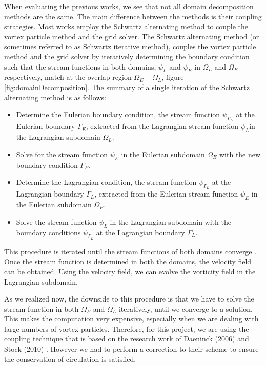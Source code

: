 When evaluating the previous works, we see that not all domain decomposition methods are the same. The main difference between the methods is their coupling strategies. Most works employ the Schwartz alternating method to couple the vortex particle method and the grid solver. The Schwartz alternating method (or sometimes referred to as Schwartz iterative method), couples the vortex particle method and the grid solver by iteratively determining the boundary condition such that the stream functions in both domains, $\psi_L$ and $\psi_E$ in $\Omega_L$ and $\Omega_E$ respectively, match at the overlap region $\Omega_E-\Omega_L$, figure \ref{fig:domainDecomposition}. The summary of a single iteration of the Schwartz alternating method is as follows:
	\begin{itemize}
	\item Determine the Eulerian boundary condition, the stream function $\psi_{\Gamma_E}$ at the Eulerian boundary $\Gamma_E$, extracted from the Lagrangian stream function $\psi_L$in the Lagrangian subdomain $\Omega_L$.
	\item Solve for the stream function $\psi_E$ in the Eulerian subdomain $\Omega_E$ with the new boundary condition $\Gamma_E$.
	\item Determine the Lagrangian condition, the stream function $\psi_{\Gamma_L}$ at the Lagrangian boundary $\Gamma_L$, extracted from the Eulerian stream function $\psi_E$ in the Eulerian subdomain $\Omega_E$.
	\item Solve the stream function $\psi_L$ in the Lagrangian subdomain with the boundary conditions $\psi_{\Gamma_L}$ at the Lagrangian boundary $\Gamma_L$.
	\end{itemize}
	
This procedure is iterated until the stream functions of both domains converge \cite{Ould-Salihi2001a}. Once the stream function is determined in both the domains, the velocity field can be obtained. Using the velocity field, we can evolve the vorticity field in the Lagrangian subdomain.

As we realized now, the downside to this procedure is that we have to solve the stream function in both $\Omega_E$ and $\Omega_L$ iteratively, until we converge to a solution. This makes the computation very expensive, especially when we are dealing with large numbers of vortex particles. Therefore, for this project, we are using the coupling technique that is based on the research work of Daeninck (2006) \cite{Daeninck2006} and Stock (2010) \cite{Stock2010a}. However we had to perform a correction to their scheme to ensure the conservation of circulation is satisfied.

